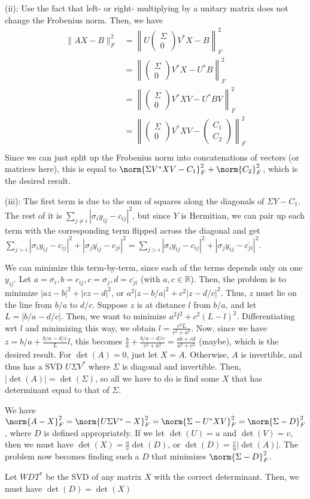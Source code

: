 \documentclass{article}
\newcommand{\conj}{\overline}
\newcommand{\openm}{\begin{pmatrix}}
\newcommand{\closem}{\end{pmatrix}}
\newcommand{\rn}{\mathbb{R}}
\begin{document}
\noindent(ii): Use the fact that left- or right- multiplying by a unitary matrix does not change the Frobenius norm. Then, we have
\begin{align*}
    \|AX-B\|_F^2&=\left\|U\openm\Sigma\\0\closem V^*X-B\right\|_F^2\\
                &=\left\|\openm\Sigma\\0\closem V^*X-U^*B\right\|_F^2\\
                &=\left\|\openm\Sigma\\0\closem V^*XV-U^*BV\right\|_F^2\\
                &=\left\|\openm\Sigma\\0\closem V^*XV-\openm C_1\\C_2\closem\right\|_F^2\\
\end{align*}
Since we can just split up the Frobenius norm into concatenations of vectors (or matrices here), this is equal to $\norm{\Sigma V^*XV-C_1}_F^2+\norm{C_2}_F^2$, which is the desired result.

\noindent(iii): The first term is due to the sum of squares along the diagonals of $\Sigma Y-C_1$. The rest of it is $\sum_{j\neq i}|\sigma_iy_{ij}-c_{ij}|^2$, but since $Y$ is Hermitian, we can pair up each term with the corresponding term flipped across the diagonal and get $\sum_{j>i}|\sigma_iy_{ij}-c_{ij}|^2+|\sigma_j\conj{y_{ij}}-c_{ji}|^2=\sum_{j>i}|\sigma_iy_{ij}-c_{ij}|^2+|\sigma_jy_{ij}-\conj{c_{ji}}|^2$. 

We can minimize this term-by-term, since each of the terms depends only on one $y_{ij}$. Let $a=\sigma_i, b=c_{ij}, c=\sigma_j, d=\conj{c_{ji}}$ (with $a,c\in\rn$). Then, the problem is to minimize $|az-b|^2+|cz-d|^2$, or $a^2|z-b/a|^2+c^2|z-d/c|^2$. Thus, $z$ must lie on the line from $b/a$ to $d/c$. Suppose $z$ is at distance $l$ from $b/a$, and let $L=|b/a-d/c|$. Then, we want to minimize $a^2l^2+c^2(L-l)^2$. Differentiating wrt $l$ and minimizing this way, we obtain $l=\frac{c^2L}{c^2+a^2}$. Now, since we have $z=b/a+\frac{b/a-d/c}{L}l$, this becomes $\frac{b}{a}+\frac{b/a-d/c}{c^2+a^2}=\frac{ab+cd}{a^2+c^2}$ (maybe), which is the desired result.
For $\det(A)=0$, just let $X=A$. Otherwise, $A$ is invertible, and thus has a SVD $U\Sigma V^*$ where $\Sigma$ is diagonal and invertible. Then, $|\det(A)|=\det(\Sigma)$, so all we have to do is find some $X$ that has determinant equal to that of $\Sigma$.

We have $\norm{A-X}_F^2=\norm{U\Sigma V^*-X}_F^2=\norm{\Sigma-U^*XV}_F^2=\norm{\Sigma-D}_F^2$, where $D$ is defined appropriately. If we let $\det(U)=u$ and $\det(V)=v$, then we must have $\det(X)=\frac{u}{v}\det(D)$, or $\det(D)=\frac{v}{u}|\det(A)|$. The problem now becomes finding such a $D$ that minimizes $\norm{\Sigma-D}_F^2$. 


Let $WDT^*$ be the SVD of any matrix $X$ with the correct determinant. Then, we must have $\det(D)=\det(X)$
\end{document}
